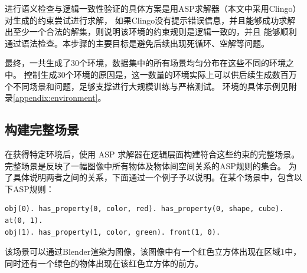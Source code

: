 进行语义检查与逻辑一致性验证的具体方案是用ASP求解器（本文中采用Clingo）对生成的约束尝试进行求解，
如果Clingo没有提示错误信息，并且能够成功求解出至少一个合法的解集，则说明该环境的约束规则是逻辑一致的，并且
能够顺利通过语法检查。本步骤的主要目标是避免后续出现死循环、空解等问题。

最终，一共生成了30个环境，数据集中的所有场景均匀分布在这些不同的环境之中。
控制生成30个环境的原因是，这一数量的环境实际上可以供后续生成数百万个不同场景和问题，足够支撑进行大规模训练与严格测试。
环境的具体示例见附录\ref{appendix:environment}。

\subsection{构建完整场景}
在获得特定环境后，使用 ASP 求解器在逻辑层面构建符合这些约束的完整场景。
完整场景是反映了一幅图像中所有物体及物体间空间关系的ASP规则的集合。
为了具体说明两者之间的关系，下面通过一个例子予以说明。在某个场景中，包含以下ASP规则：
\begin{lstlisting}
obj(0). has_property(0, color, red). has_property(0, shape, cube). at(0, 1).
obj(1). has_property(1, color, green). front(1, 0).
\end{lstlisting}
该场景可以通过Blender渲染为图像，该图像中有一个红色立方体出现在区域1中，
同时还有一个绿色的物体出现在该红色立方体的前方。

